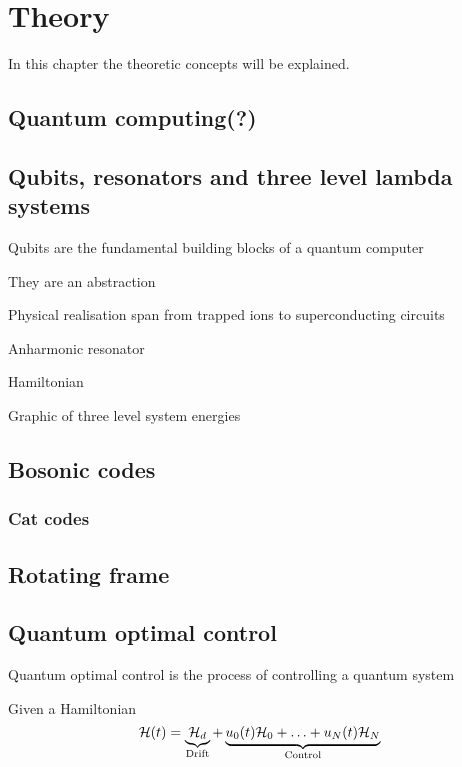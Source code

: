 \documentclass[main.tex]{subfiles}
\begin{document}
\chapter{Theory}
In this chapter the theoretic concepts will be explained.
\section{Quantum computing(?)}

\section{Qubits, resonators and three level lambda systems}
Qubits are the fundamental building blocks of a quantum computer

They are an abstraction

Physical realisation span from trapped ions to superconducting circuits

Anharmonic resonator

Hamiltonian

Graphic of three level system energies


\section{Bosonic codes}


\subsection{Cat codes}



\section{Rotating frame}



\section{Quantum optimal control}
Quantum optimal control is the process of controlling a quantum system

Given a Hamiltonian
\begin{equation}
    \mathcal{H}(t) = \underbrace{\mathcal{H}_d}_{\text{Drift}} + \underbrace{u_0(t)\mathcal{H}_0 + \dotsc + u_N(t)\mathcal{H}_N}_{\text{Control}}
\end{equation}

\end{document}
